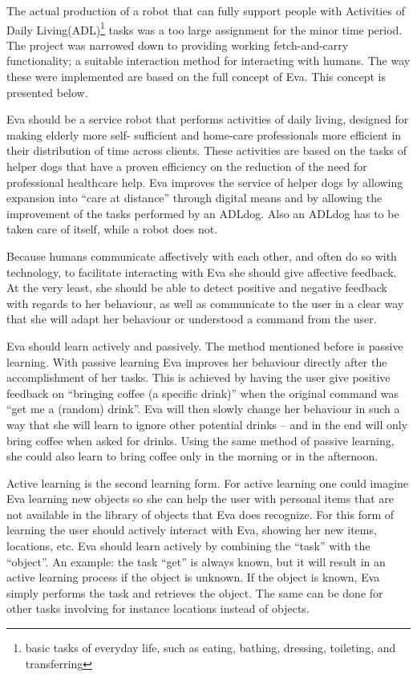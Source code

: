 \documentclass[project_eva.tex]{subfiles}
\begin{document}
The actual production of a robot that can fully support people with Activities of Daily Living(ADL)\footnote{basic tasks of everyday life, such as eating, bathing, dressing, toileting, and transferring}  tasks was a too large assignment for the minor time period. The project was narrowed down to providing working fetch-and-carry functionality; a suitable interaction method for interacting with humans. The way these were implemented are based on the full concept of Eva. This concept is presented below.

Eva should be a service robot that performs activities of daily living, designed for making elderly more self-
sufficient\cite{Forlizzi} and home-care professionals more efficient in their distribution of time across clients. These 
activities are based on the tasks of helper dogs that have a proven efficiency on the reduction of the need for 
professional healthcare help\cite{Diepenhorst}. Eva improves the service of helper dogs by allowing 
expansion into ``care at distance'' \cite{Evers} through digital means and by allowing the improvement of the tasks 
performed by an ADLdog. Also an ADLdog has to be taken care of itself, while a robot does not.

Because humans communicate affectively with each other, and often do so with technology, to facilitate interacting with Eva she should give affective feedback. At the very least, she should be able to detect positive and negative feedback with regards to her behaviour, as well as communicate to the user in a clear way that she will adapt her behaviour or understood a command from the user.

Eva should learn actively and passively. The method mentioned before is passive learning. \cite{Joost} With passive learning Eva improves her behaviour directly after the accomplishment of her tasks. This is achieved by having the user give positive feedback on ``bringing coffee (a specific drink)''  when the original command was ``get me a (random) drink''.  Eva will then slowly change her behaviour in such a way that she will learn to ignore other potential drinks – and in the end will only bring coffee when asked for drinks. Using the same method of passive learning, she could also learn to bring coffee only in the morning or in the afternoon.

\label{sec:Concept}
Active learning is the second learning form. For active learning one could imagine Eva learning new objects so 
she can help the user with personal items that are not available in the library of objects that Eva does recognize. 
For this form of learning the user should actively interact with Eva, showing her new items, locations, etc. Eva should 
learn actively by combining the ``task'' with the ``object''. An example: the task ``get'' is always known, but it will 
result in an active learning process if the object is unknown. If the object is known, Eva simply performs the task and 
retrieves the object. The same can be done for other tasks involving for instance locations instead of objects.
\end{document}
